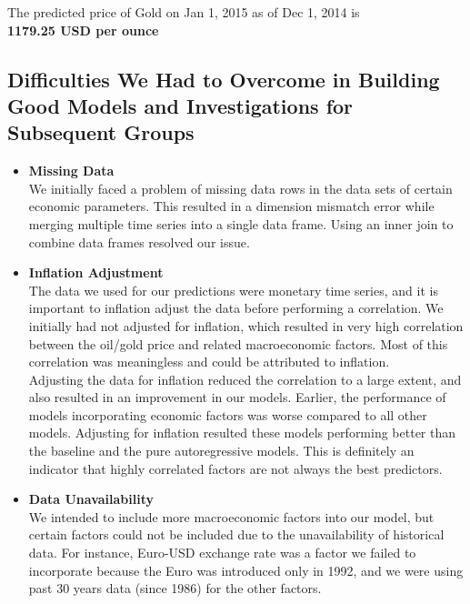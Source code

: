 \documentclass[runningheads]{llncs}
\begin{document}
\noindent The predicted price of Gold on Jan 1, 2015 as of Dec 1, 2014 is \\
\textbf{1179.25 USD per ounce} \\

\subsection {Difficulties We Had to Overcome in Building Good Models and Investigations for Subsequent Groups}

\begin{itemize}

\item \textbf{Missing Data} \\
We initially faced a problem of missing data rows in the data sets of certain economic parameters. This resulted in a dimension mismatch error while merging multiple time series into a single data frame. Using an inner join to combine data frames resolved our issue. \\

\item \textbf{Inflation Adjustment} \\
The data we used for our predictions were monetary time series, and it is important to inflation adjust the data before performing a correlation. We initially had not adjusted for inflation, which resulted in very high correlation between the oil/gold price and related macroeconomic factors. Most of this correlation was meaningless and could be attributed to inflation. \\

Adjusting the data for inflation reduced the correlation to a large extent, and also resulted in an improvement in our models. Earlier, the performance of models incorporating economic factors was worse compared to all other models. Adjusting for inflation resulted these models performing better than the baseline and the pure autoregressive models. This is definitely an indicator that highly correlated factors are not always the best predictors. \\

\item \textbf{Data Unavailability} \\
We intended to include more macroeconomic factors into our model, but certain factors could not be included due to the unavailability of historical data. For instance, Euro-USD exchange rate was a factor we failed to incorporate because the Euro was introduced only in 1992, and we were using past 30 years data (since 1986) for the other factors.  \\


\end{itemize}
\end{document}

